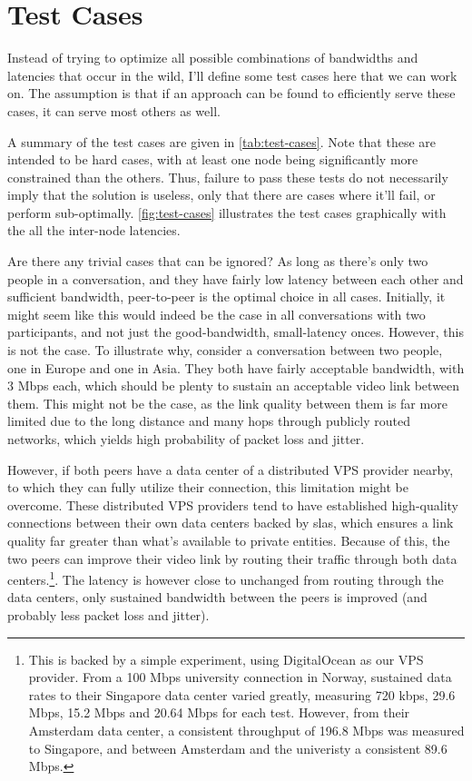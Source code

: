 \chapter{Test Cases}\label{chp:test-cases}

Instead of trying to optimize all possible combinations of bandwidths and latencies that occur in the wild, I'll define some test cases here that we can work on. The assumption is that if an approach can be found to efficiently serve these cases, it can serve most others as well.

A summary of the test cases are given in \autoref{tab:test-cases}. Note that these are intended to be hard cases, with at least one node being significantly more constrained than the others. Thus, failure to pass these tests do not necessarily imply that the solution is useless, only that there are cases where it'll fail, or perform sub-optimally. \autoref{fig:test-cases} illustrates the test cases graphically with the all the inter-node latencies.

Are there any trivial cases that can be ignored? As long as there's only two people in a conversation, and they have fairly low latency between each other and sufficient bandwidth, peer-to-peer is the optimal choice in all cases. Initially, it might seem like this would indeed be the case in all conversations with two participants, and not just the good-bandwidth, small-latency onces. However, this is not the case. To illustrate why, consider a conversation between two people, one in Europe and one in Asia. They both have fairly acceptable bandwidth, with 3 Mbps each, which should be plenty to sustain an acceptable video link between them. This might not be the case, as the link quality between them is far more limited due to the long distance and many hops through publicly routed networks, which yields high probability of packet loss and jitter.

However, if both peers have a data center of a distributed VPS provider nearby, to which they can fully utilize their connection, this limitation might be overcome. These distributed VPS providers tend to have established high-quality connections between their own data centers backed by \glspl{sla}, which ensures a link quality far greater than what's available to private entities. Because of this, the two peers can improve their video link by routing their traffic through both data centers.\footnote{This is backed by a simple experiment, using DigitalOcean as our VPS provider. From a 100 Mbps university connection in Norway, sustained data rates to their Singapore data center varied greatly, measuring 720 kbps, 29.6 Mbps, 15.2 Mbps and 20.64 Mbps for each test. However, from their Amsterdam data center, a consistent throughput of 196.8 Mbps was measured to Singapore, and between Amsterdam and the univeristy a consistent 89.6 Mbps.}. The latency is however close to unchanged from routing through the data centers, only sustained bandwidth between the peers is improved (and probably less packet loss and jitter).

